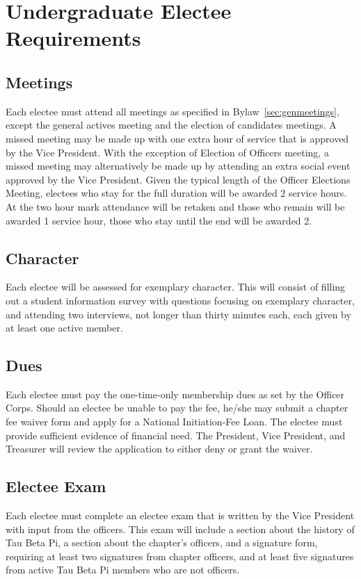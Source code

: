 \chapter{Undergraduate Electee Requirements}\label{sec:ugradreqs}
\section{Meetings} Each electee must attend all meetings as specified in Bylaw~\ref{sec:genmeetings}, except the general actives meeting and the election of candidates  meetings. A missed meeting may be made up with one extra hour of service that is approved by the Vice President. 
With the exception of Election of Officers meeting, a missed meeting may alternatively be made up by attending an extra social event approved by the Vice President. Given the typical length of the Officer Elections Meeting, electees who stay for the full duration will be awarded 2 service hours. At the two hour mark attendance will be retaken and those who remain will be awarded 1 service hour, those who stay until the end will be awarded 2.
\section{Character} Each electee will be assessed for exemplary character. This will consist of filling out a student information survey with questions focusing on exemplary character, and attending two interviews, not longer than thirty minutes each, each given by at least one active member.
\section{Dues} Each electee must pay the one-time-only membership dues as set by the Officer Corps. Should an electee be unable to pay the fee, he/she may submit a chapter fee waiver form and apply for a National Initiation-Fee Loan. The electee must provide sufficient evidence of financial need. The President, Vice President, and Treasurer will review the application to either deny or grant the waiver.
\section{Electee Exam} Each electee must complete an electee exam that is written by the Vice President with input from the officers. This exam will include a section about the history of Tau Beta Pi, a section about the chapter's officers, and a signature form, requiring at least two signatures from chapter officers, and at least five signatures from active Tau Beta Pi members who are not officers.
